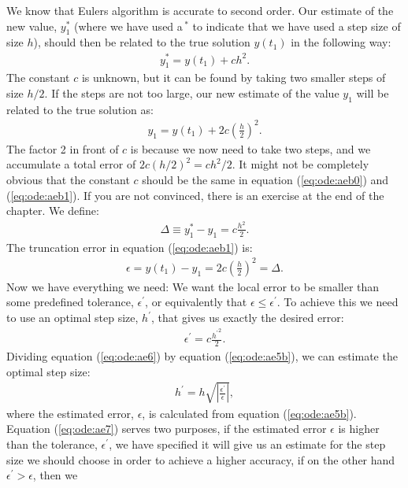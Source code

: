 \documentclass[graybox,sectrefs,envcountresetchap,open=right,final]{svmonodo}
\begin{document}
We know that Eulers algorithm is accurate to second order. Our estimate of the new value, $y_1^*$  
(where we have used a$\,{}^*$ to indicate that we have used a step size of size $h$), should then be related to the true solution $y(t_1)$ in the following way:
\begin{align}
y^*_1=y(t_1)+ch^2.\label{eq:ode:aeb0}
\end{align}
The constant $c$ is unknown, but it can be found by taking two smaller steps of size $h/2$. If the steps are not too large, our new estimate
of the value $y_1$ will be related to the true solution as:
\begin{align}
y_1=y(t_1)+2c\left(\frac{h}{2}\right)^2.\label{eq:ode:aeb1}
\end{align}
The factor 2 in front of $c$ is because we now need to take two steps, and we accumulate a total error of $2c(h/2)^2=ch^2/2$. It might not be completely 
obvious that the constant $c$ should be the same in equation (\ref{eq:ode:aeb0}) and (\ref{eq:ode:aeb1}). If you are not convinced, there is an exercise at the end 
of the chapter.  
We define:
\begin{align}
\Delta\equiv y^*_1-y_1=c\frac{h^2}{2}.\label{eq:ode:ae5}
\end{align}
The truncation error in equation (\ref{eq:ode:aeb1}) is:
\begin{align}
\epsilon=y(t_1)-y_1=2c\left(\frac{h}{2}\right)^2=\Delta.\label{eq:ode:ae5b}
\end{align}
Now we have everything we need: We want the local error to be smaller than some predefined
tolerance, $\epsilon^\prime$, or equivalently 
that $\epsilon\le\epsilon^\prime$. 
To achieve this we need to use an optimal step size, $h^\prime$,  that gives us exactly the desired error:
\begin{align}
\epsilon^\prime=c\frac{{h^\prime}^2}{2}.\label{eq:ode:ae6}
\end{align}
Dividing equation (\ref{eq:ode:ae6}) by equation (\ref{eq:ode:ae5b}), we can estimate the optimal step size:
\begin{align}
h^\prime=h\sqrt{\left|\frac{\epsilon^\prime}{\epsilon}\right|},\label{eq:ode:ae7}
\end{align}
where the estimated error, $\epsilon$, is calculated from equation (\ref{eq:ode:ae5b}).
Equation (\ref{eq:ode:ae7}) serves two purposes, if the estimated error $\epsilon$ is higher than the tolerance, $\epsilon^\prime$, we have specified it will 
give us an estimate for the step size we should choose in order to achieve a higher accuracy, if on the other hand $\epsilon^\prime > \epsilon$, then we 
\end{document}
